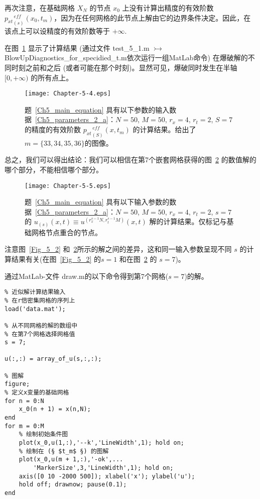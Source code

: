 \documentclass[twoside]{book}
\begin{document}
\begin{CJK*}{GBK}{song}
再次注意，在基础网格 $X_N$ 的节点 $x_0$ 上没有计算出精度的有效阶数 ${p_{xt}}_{(s)}^{\, eff}(x_0,t_m)$，因为在任何网格的此节点上解由它的边界条件决定。因此，在该点上可以设精度的有效阶数等于 $+\infty$.

在图~\ref{Fig_5_4} 显示了计算结果 (通过文件 test\_5\_1.m $\rightarrowtail$ BlowUpDiagnostics\_for\_specidied\_t.m依次运行一组MatLab命令) 在爆破解的不同时刻之前和之后 (或者可能在那个时刻)。显然可见，爆破同时发生在半轴 $[0,+\infty)$ 的所有点上。
\begin{figure}[t!]
    \centering
    \texttt{[image: Chapter-5-4.eps]}\\
    \caption{题~\eqref{Ch5_main_equation} 具有以下参数的输入数据~\eqref{Ch5_parameters_2_a}：$N = 50$, $M = 50$, $r_x = 4$, $r_t = 2$, $S = 7$的精度的有效阶数 ${p_{xt}}^{\, eff}_{(S)}(x,t_m)$ 的计算结果。给出了 $m = \{33,34,35,36\}$的图像。}
    \label{Fig_5_4}
\end{figure}

总之，我们可以得出结论：我们可以相信在第7个嵌套网格获得的图~\ref{Fig_5_5} 的数值解的哪个部分，不能相信哪个部分。
\begin{figure}[t]
    \centering
    \texttt{[image: Chapter-5-5.eps]}\\
    \caption{题~\eqref{Ch5_main_equation} 具有以下输入参数的数据~\eqref{Ch5_parameters_2_a}：$N = 50$, $M = 50$, $r_x = 4$, $r_t = 2$, $s = 7$ 的 $u_{(s)}(x,t) \equiv u^{(r_x^{s - 1}N,r_t^{s - 1}M)}(x,t)$ 解的计算结果。仅标记与基础网格节点重合的节点。}
    \label{Fig_5_5}
\end{figure}

注意图~\ref{Fig_5_2} 和~\ref{Fig_5_5}所示的解之间的差异，这和同一输入参数呈现不同 $s$ 的计算结果有关(在图~\ref{Fig_5_2} 的$s = 1$ 和在图~\ref{Fig_5_5} 的 $s = 7$)。



通过MatLab-文件 draw.m的以下命令得到第7个网格($s = 7$)的解。
\newpage
%
\begin{lstlisting}
% 近似解计算结果输入
% 在r倍密集网格的序列上
load('data.mat');

% 从不同网格的解的数组中
% 在第7个网格选择网格值
s = 7;

u(:,:) = array_of_u(s,:,:);

% 图解
figure;
% 定义x变量的基础网格
for n = 0:N
    x_0(n + 1) = x(n,N);
end
for m = 0:M
    % 绘制初始条件图
    plot(x_0,u(1,:),'--k','LineWidth',1); hold on;
    % 绘制在 (§ $t_m$ §) 的图解
    plot(x_0,u(m + 1,:),'-ok',...
        'MarkerSize',3,'LineWidth',1); hold on;
    axis([0 10 -2000 500]); xlabel('x'); ylabel('u');
    hold off; drawnow; pause(0.1);
end
\end{lstlisting}




\end{CJK*}
\end{document}

